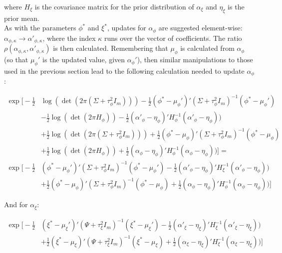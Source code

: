 \documentclass{article}
\begin{document}
where $H_\xi$ is the covariance matrix for the prior distribution of $\alpha_\xi$ and $\eta_\xi$ is the prior mean. \\

As with the parameters $\phi^*$ and $\xi^*$, updates for $\alpha_\phi$ are suggested element-wise: $\alpha_{\phi,\kappa} \to \alpha'_{\phi,\kappa}$, where the index $\kappa$ runs over the vector of coefficients. The ratio $\rho(\alpha_{\phi,\kappa}, \alpha'_{\phi,\kappa})$ is then calculated. Remembering that $\mu_\phi$ is calculated from $\alpha_\phi$ (so that $\mu_\phi'$ is the updated value, given $\alpha_\phi'$), then similar manipulations to those used in the previous section lead to the following calculation needed to update $\alpha_\phi$:

\begin{align}
\exp \Big[ - \frac{1}{2} & \log(\det(2 \pi (\Sigma + \tau^2_\phi I_m))) -\frac{1}{2} (\phi^* - \mu_\phi')' (\Sigma + \tau^2_\phi I_m)^{-1} (\phi^* - \mu_\phi') \nonumber \\
& - \frac{1}{2} \log(\det(2 \pi H_\phi)) -\frac{1}{2} (\alpha'_\phi - \eta_\phi)' H_\phi^{-1} (\alpha'_\phi - \eta_\phi) ) \nonumber \\
& + \frac{1}{2} \log(\det(2 \pi (\Sigma + \tau^2_\phi I_m))) + \frac{1}{2} (\phi^* - \mu_\phi)' (\Sigma + \tau^2_\phi I_m)^{-1} (\phi^* - \mu_\phi) \nonumber \\
& + \frac{1}{2} \log(\det(2 \pi H_\phi)) + \frac{1}{2} (\alpha_\phi - \eta_\phi)' H_\phi^{-1} (\alpha_\phi - \eta_\phi) )
\Big] = \nonumber \\
\exp \Big[ -\frac{1}{2} & (\phi^* - \mu_\phi')' (\Sigma + \tau^2_\phi I_m)^{-1} (\phi^* - \mu_\phi') -\frac{1}{2} (\alpha'_\phi - \eta_\phi)' H_\xi^{-1} (\alpha'_\phi - \eta_\phi) ) \nonumber \\
& + \frac{1}{2} (\phi^* - \mu_\phi)' (\Sigma + \tau^2_\phi I_m)^{-1} (\phi^* - \mu_\phi) + \frac{1}{2} (\alpha_\phi - \eta_\phi)' H_\phi^{-1} (\alpha_\phi - \eta_\phi) )
\Big] \label{eq:2a1}
\end{align}

And for $\alpha_\xi$:

\begin{align}
\exp \Big[ -\frac{1}{2} & (\xi^* - \mu_\xi')' (\Psi + \tau^2_\xi I_m)^{-1} (\xi^* - \mu_\xi') -\frac{1}{2} (\alpha'_\xi - \eta_\xi)' H_\xi^{-1} (\alpha'_\xi - \eta_\xi) ) \nonumber \\
& + \frac{1}{2} (\xi^* - \mu_\xi)' (\Psi + \tau^2_\xi I_m)^{-1} (\xi^* - \mu_\xi) + \frac{1}{2} (\alpha_\xi - \eta_\xi)' H_\xi^{-1} (\alpha_\xi - \eta_\xi) )
\Big] \label{eq:2a2}
\end{align}
\end{document}
